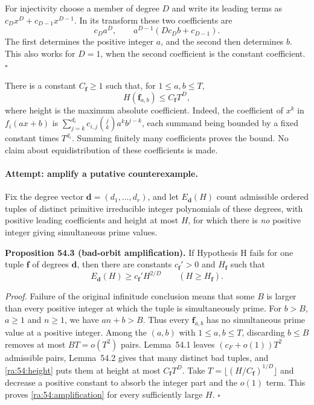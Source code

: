 \documentclass[11pt]{article}
\begin{document}
For injectivity choose a member of degree $D$ and write its leading
terms as $c_Dx^D+c_{D-1}x^{D-1}$. In its transform these two coefficients
are
\[
 c_Da^D,\qquad a^{D-1}(D c_D b+c_{D-1}).
\]
The first determines the positive integer $a$, and the second then
determines $b$. This also works for $D=1$, when the second coefficient
is the constant coefficient. \hfill$\square$

There is a constant $C_{\mathbf f}\ge1$ such that, for $1\le a,b\le T$,
\begin{equation}\label{ra:54:height}
 H(\mathbf f_{a,b})\le C_{\mathbf f}T^D,
\end{equation}
where height is the maximum absolute coefficient. Indeed, the coefficient
of $x^k$ in $f_i(ax+b)$ is
$\sum_{j=k}^{d_i}c_{i,j}\binom jk a^k b^{j-k}$, each summand being
bounded by a fixed constant times $T^{d_i}$. Summing finitely many
coefficients proves the bound. No claim about equidistribution of these
coefficients is made.

\paragraph{Attempt: amplify a putative counterexample.}
Fix the degree vector $\mathbf d=(d_1,\ldots,d_r)$, and let
$E_{\mathbf d}(H)$ count admissible ordered tuples of distinct primitive
irreducible integer polynomials of these degrees, with positive leading
coefficients and height at most $H$, for which there is \emph{no}
positive integer giving simultaneous prime values.

\textbf{Proposition 54.3 (bad-orbit amplification).} If Hypothesis H
fails for one tuple $\mathbf f$ of degrees $\mathbf d$, then there are
constants $c_{\mathbf f}'>0$ and $H_{\mathbf f}$ such that
\begin{equation}\label{ra:54:amplification}
 E_{\mathbf d}(H)\ge c_{\mathbf f}'H^{2/D}
 \qquad(H\ge H_{\mathbf f}).
\end{equation}

\textit{Proof.} Failure of the original infinitude conclusion means
that some $B$ is larger than every positive integer at which the tuple
is simultaneously prime. For $b>B$, $a\ge1$ and $n\ge1$, we have
$an+b>B$. Thus every $\mathbf f_{a,b}$ has no simultaneous prime value
at a positive integer. Among the $(a,b)$ with $1\le a,b\le T$, discarding
$b\le B$ removes at most $BT=o(T^2)$ pairs. Lemma~54.1 leaves
$(c_F+o(1))T^2$ admissible pairs, Lemma~54.2 gives that many distinct
bad tuples, and \eqref{ra:54:height} puts them at height at most
$C_{\mathbf f}T^D$. Take
$T=\lfloor(H/C_{\mathbf f})^{1/D}\rfloor$ and decrease a positive
constant to absorb the integer part and the $o(1)$ term. This proves
\eqref{ra:54:amplification} for every sufficiently large $H$.
\hfill$\square$
\end{document}
